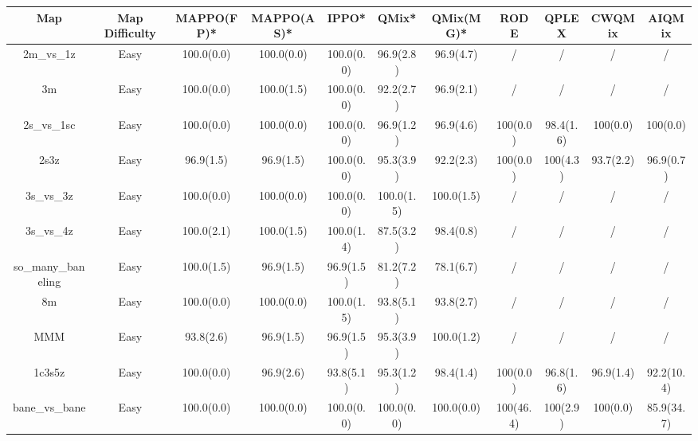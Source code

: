 \begin{table}
\centering
\vspace{-1mm}
\captionsetup{justification=centering}
\begin{tabular}{ccccccccccc}
\toprule
             Map & Map Difficulty & MAPPO(FP)* & MAPPO(AS)* &     IPPO* &     QMix* & QMix(MG)* &        RODE &      QPLEX &     CWQMix &     AIQMix \\
\midrule
        2m\_vs\_1z &           Easy &  100.0(0.0) &  100.0(0.0) & 100.0(0.0) &  96.9(2.8) &  96.9(4.7) &           / &          / &          / &          / \\
              3m &           Easy &  100.0(0.0) &  100.0(1.5) & 100.0(0.0) &  92.2(2.7) &  96.9(2.1) &           / &          / &          / &          / \\
       2s\_vs\_1sc &           Easy &  100.0(0.0) &  100.0(0.0) & 100.0(0.0) &  96.9(1.2) &  96.9(4.6) &    100(0.0) &  98.4(1.6) &   100(0.0) &   100(0.0) \\
            2s3z &           Easy &   96.9(1.5) &   96.9(1.5) & 100.0(0.0) &  95.3(3.9) &  92.2(2.3) &    100(0.0) &   100(4.3) &  93.7(2.2) &  96.9(0.7) \\
        3s\_vs\_3z &           Easy &  100.0(0.0) &  100.0(0.0) & 100.0(0.0) & 100.0(1.5) & 100.0(1.5) &           / &          / &          / &          / \\
        3s\_vs\_4z &           Easy &  100.0(2.1) &  100.0(1.5) & 100.0(1.4) &  87.5(3.2) &  98.4(0.8) &           / &          / &          / &          / \\
so\_many\_baneling &           Easy &  100.0(1.5) &   96.9(1.5) &  96.9(1.5) &  81.2(7.2) &  78.1(6.7) &           / &          / &          / &          / \\
              8m &           Easy &  100.0(0.0) &  100.0(0.0) & 100.0(1.5) &  93.8(5.1) &  93.8(2.7) &           / &          / &          / &          / \\
             MMM &           Easy &   93.8(2.6) &   96.9(1.5) &  96.9(1.5) &  95.3(3.9) & 100.0(1.2) &           / &          / &          / &          / \\
          1c3s5z &           Easy &  100.0(0.0) &   96.9(2.6) &  93.8(5.1) &  95.3(1.2) &  98.4(1.4) &    100(0.0) &  96.8(1.6) &  96.9(1.4) & 92.2(10.4) \\
    bane\_vs\_bane &           Easy &  100.0(0.0) &  100.0(0.0) & 100.0(0.0) & 100.0(0.0) & 100.0(0.0) &   100(46.4) &   100(2.9) &   100(0.0) & 85.9(34.7) \\

\end{tabular}
\end{table}
